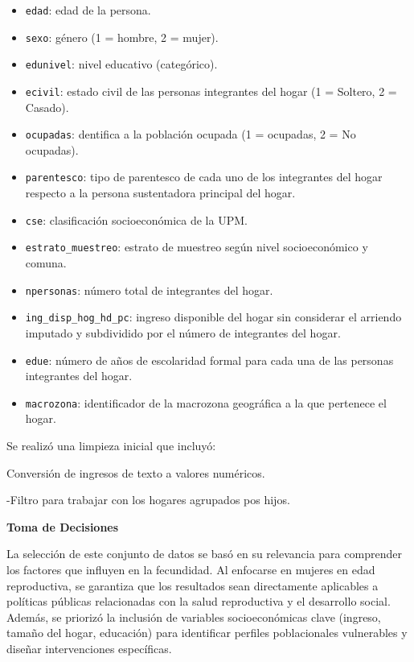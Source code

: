 \documentclass[
]{article}
\providecommand{\tightlist}{%
  \setlength{\itemsep}{0pt}\setlength{\parskip}{0pt}}
\begin{document}
\begin{itemize}
\tightlist
\item
  \texttt{edad}: edad de la persona.
\item
  \texttt{sexo}: género (1 = hombre, 2 = mujer).
\item
  \texttt{edunivel}: nivel educativo (categórico).
\item
  \texttt{ecivil}: estado civil de las personas integrantes del hogar (1
  = Soltero, 2 = Casado).
\item
  \texttt{ocupadas}: dentifica a la población ocupada (1 = ocupadas, 2 =
  No ocupadas).
\item
  \texttt{parentesco}: tipo de parentesco de cada uno de los integrantes
  del hogar respecto a la persona sustentadora principal del hogar.
\item
  \texttt{cse}: clasificación socioeconómica de la UPM.
\item
  \texttt{estrato\_muestreo}: estrato de muestreo según nivel
  socioeconómico y comuna.
\item
  \texttt{npersonas}: número total de integrantes del hogar.
\item
  \texttt{ing\_disp\_hog\_hd\_pc}: ingreso disponible del hogar sin
  considerar el arriendo imputado y subdividido por el número de
  integrantes del hogar.
\item
  \texttt{edue}: número de años de escolaridad formal para cada una de
  las personas integrantes del hogar.
\item
  \texttt{macrozona}: identificador de la macrozona geográfica a la que
  pertenece el hogar.
\end{itemize}

Se realizó una limpieza inicial que incluyó:

Conversión de ingresos de texto a valores numéricos.

-Filtro para trabajar con los hogares agrupados pos hijos.

\textbf{Toma de Decisiones}

La selección de este conjunto de datos se basó en su relevancia para
comprender los factores que influyen en la fecundidad. Al enfocarse en
mujeres en edad reproductiva, se garantiza que los resultados sean
directamente aplicables a políticas públicas relacionadas con la salud
reproductiva y el desarrollo social. Además, se priorizó la inclusión de
variables socioeconómicas clave (ingreso, tamaño del hogar, educación)
para identificar perfiles poblacionales vulnerables y diseñar
intervenciones específicas.
\end{document}

